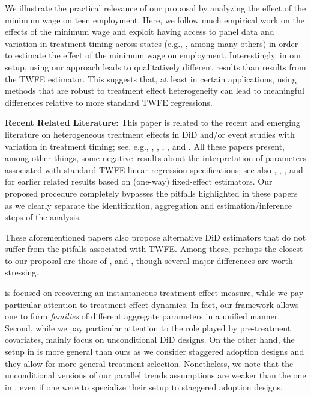 \documentclass[11pt]{article}%
\theoremstyle{plain}
\numberwithin{sassumption}{section}
\numberwithin{equation}{section}
\begin{document}
We illustrate the practical relevance of our proposal by analyzing the effect
of the minimum wage on teen employment. Here, we follow much empirical work on
the effects of the minimum wage and exploit having access to panel data and
variation in treatment timing across states (e.g.,
\cite{Card1994,Neumark2000,Neumark2008,Dube2010}, among many others) in order
to estimate the effect of the minimum wage on employment. Interestingly, in
our setup, using our approach leads to qualitatively different results than
results from the TWFE estimator. This suggests that, at least in certain
applications, using methods that are robust to treatment effect heterogeneity
can lead to meaningful differences relative to more standard TWFE
regressions.\bigskip

\textbf{Recent Related Literature: }This paper is related to the recent and
emerging literature on heterogeneous treatment effects in DiD and/or event
studies with variation in treatment timing; see, e.g.,
\cite{DeChaisemartin2016}, \cite{Goodman-bacon2017}, \cite{Imai2018},
\cite{Borusyak2017}, \cite{Athey2018} and \cite{Abraham2018}. All these papers
present, among other things, some negative\ results about the interpretation
of parameters associated with standard TWFE linear regression specifications;
see also \cite{Laporte2005}, \cite{Wooldridge2005}, \cite{Chernozhukov2013},
and \cite{Gibbons2018} for earlier related results based on (one-way)
fixed-effect estimators. Our proposed procedure completely bypasses the
pitfalls highlighted in these papers as we clearly separate the
identification, aggregation and estimation/inference steps of the analysis.

These aforementioned papers also propose alternative DiD estimators that do
not suffer from the pitfalls associated with TWFE. Among these, perhaps
the closest to our proposal are those of \cite{DeChaisemartin2016}, and
\cite{Abraham2018}, though several major differences are worth stressing.

\cite{DeChaisemartin2016} is focused on recovering an instantaneous
treatment effect measure, while we pay particular attention to treatment
effect dynamics. In fact, our framework allows one to form \textit{families}
of different aggregate parameters in a unified manner. Second, while we pay
particular attention to the role played by pre-treatment covariates,
\cite{DeChaisemartin2016} mainly focus on unconditional DiD 
designs. On the
other hand, the setup in \cite{DeChaisemartin2016} is more general than ours
as we consider staggered adoption designs and they allow for more general
treatment selection. Nonetheless, we note that the unconditional versions of
our parallel trends assumptions are weaker than the one in
\cite{DeChaisemartin2016}, even if one were to specialize their setup to
staggered adoption designs.
\end{document}
